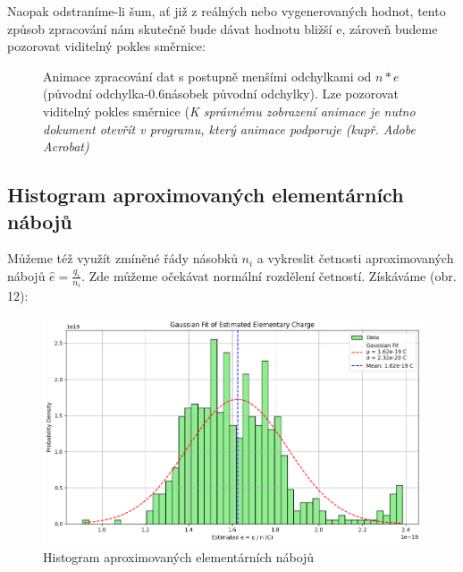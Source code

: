 \documentclass[czech,11pt,a4paper]{article}
\begin{document}
\begin{multicols}{2}
\begin{figure}[H]
	 	\end{figure}
	 	Naopak odstraníme-li šum, ať již z reálných nebo vygenerovaných hodnot, tento způsob zpracování nám skutečně bude dávat hodnotu bližší e, zároveň budeme pozorovat viditelný pokles směrnice:
	 	
	 	\begin{figure}[H]
	 		\centering

	 		\caption{Animace zpracování dat s postupně menšími odchylkami od $n*e$ (původní odchylka-0.6násobek původní odchylky). Lze pozorovat viditelný pokles směrnice (\textit{K správnému zobrazení animace je nutno dokument otevřít v programu, který animace podporuje (kupř. Adobe Acrobat)}}
	 		
	 	\end{figure}
	 	\subsection{Histogram aproximovaných elementárních nábojů}
	 	Můžeme též využít zmíněné řády násobků $n_i$ a vykreslit četnosti aproximovaných nábojů $\hat{e} = \frac{q_i}{n_i}$. Zde můžeme očekávat normální rozdělení četností. Získáváme (obr. 12):
	 	\begin{figure}[H]
	 		\centering
	 		\includegraphics[width=0.8\linewidth]{gauss1}
	 		\caption{Histogram aproximovaných elementárních nábojů}
	 		

\end{figure}
\end{multicols}
\end{document}
